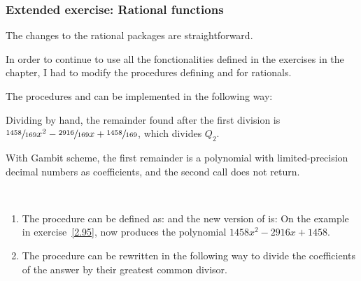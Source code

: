 \subsubsection{Extended exercise: Rational functions}

\begin{exe}[2.93]
    The changes to the rational packages are straightforward.

    \begin{comp}
        In order to continue to use all the fonctionalities defined in the 
        exercises in the chapter, I had to modify the procedures defining 
         and  for rationals.
    \end{comp}
\end{exe}

\begin{exe}[2.94]
    The procedures  and  can be implemented 
    in the following way:
\end{exe}

\begin{exe}[2.95]
    \label{2.95}
    Dividing by hand, the remainder found after the first division is
    $\sfrac{1458}{169} x^2 - \sfrac{2916}{169} x + \sfrac{1458}{169}$, which 
    divides $Q_2$.

    With Gambit scheme, the first remainder is a polynomial with 
    limited-precision decimal numbers as coefficients, and the second call does not 
    return.
\end{exe}

\begin{exe}[2.96]
    \ \vspace{-20pt}
    \begin{enumerate}
        \item The procedure  can be defined as:
            and the new version of  is:
            On the example in exercise~\ref{2.95}, 
             now produces the polynomial $1458 x^2 
            - 2916 x + 1458$.
        \item The procedure can be rewritten in the following way to divide the 
            coefficients of the answer by their greatest common divisor.
    \end{enumerate}
\end{exe}

